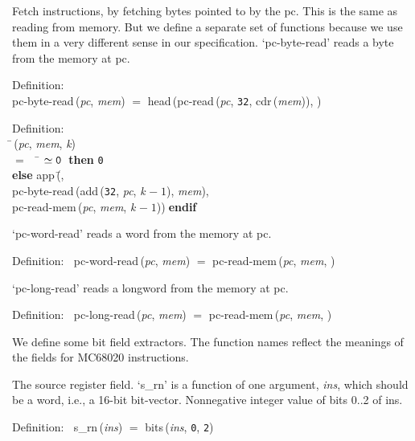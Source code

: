  Fetch instructions, by fetching bytes pointed to by the pc.  This is
 the same as reading from memory.  But we define a separate set of functions
 because we use them in a very different sense in our specification.
 `pc-byte-read' reads a byte from the memory at pc.
\begin{tabbing}{\sc Definition}: \\  
{\rm{pc-byte-read}}\,({\it{pc\/}}, {\it{mem\/}}) $=$ {\rm{head}}\,({\rm{pc-read}}\,({\it{pc\/}}, {\tt{32}}, {\rm{cdr}}\,({\it{mem\/}})), {})
\end{tabbing}

\begin{tabbing}{\sc Definition}: \\  
\=\,({\it{pc\/}}, {\it{mem\/}}, {\it{k\/}}) \\ 
$=$$\;\;\;\;$\= $\simeq {\tt{0}}$$\;\;${\bf then }{\tt{0}} \\ 
{\bf else }{\rm{app}}\,(\=, \\ 
{\rm{pc-byte-read}}\,({\rm{add}}\,({\tt{32}}, {\it{pc\/}}, {\it{k\/}} $-\;1$), {\it{mem\/}}), \\ 
{\rm{pc-read-mem}}\,({\it{pc\/}}, {\it{mem\/}}, {\it{k\/}} $-\;1$))\-$\;${\bf  endif}\-\-
\end{tabbing}

 `pc-word-read' reads a word from the memory at pc.
\begin{tabbing}{\sc Definition}:$\;\;$
{\rm{pc-word-read}}\,({\it{pc\/}}, {\it{mem\/}}) $=$ {\rm{pc-read-mem}}\,({\it{pc\/}}, {\it{mem\/}}, {})
\end{tabbing}

 `pc-long-read' reads a longword from the memory at pc.
\begin{tabbing}{\sc Definition}:$\;\;$
{\rm{pc-long-read}}\,({\it{pc\/}}, {\it{mem\/}}) $=$ {\rm{pc-read-mem}}\,({\it{pc\/}}, {\it{mem\/}}, {})
\end{tabbing}

 We define some bit field extractors.  The function names reflect the
 meanings of the fields for MC68020 instructions.

 The source register field.  `s\_rn' is a function of one argument, {\it{ins\/}},
 which should be a word, i.e., a 16-bit bit-vector.
 Nonnegative integer value of bits 0..2 of ins.
\begin{tabbing}{\sc Definition}:$\;\;$
{\rm{s\_rn}}\,({\it{ins\/}}) $=$ {\rm{bits}}\,({\it{ins\/}}, {\tt{0}}, {\tt{2}})
\end{tabbing}

